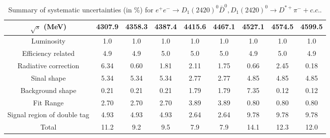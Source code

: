 \documentclass[aps,preprint,superscriptaddress,12pt,tightenlines]{revtex4}
\begin{document}
\begin{table}[htbp]
\caption{Summary of systematic uncertainties (in \%) for
$e^{+}e^{-}\to D_{1}(2420)^{0}\bar{D}^{0}, D_{1}(2420)^{0}\to D^{*+}\pi^{-} +c.c.$.}
\label{sys_err_D0star}
\begin{tabular}{c  c  c  c c c c c c}
\hline \hline
   $\sqrt{s}$ (MeV)    &4307.9   &4358.3  &4387.4   &4415.6  &4467.1   &4527.1  &4574.5   &4599.5\\
    \hline
   Luminosity                  & 1.0   & 1.0  & 1.0   & 1.0  & 1.0   & 1.0   & 1.0   & 1.0 \\
    Efficiency related          &4.9	&4.9   &5.0	   &5.0	  &5.0    &4.9	  &5.0	  &4.9 \\
    Radiative correction        &6.34   &0.60  &1.81   &2.11  &1.75   &0.66   &2.45   &0.18   \\
    Sinal shape                 &5.34   &5.34  &5.34   &2.77  &2.77   &4.85   &4.85   &4.85  \\
    Background shape            &0.21   &0.21  &0.21   &1.79  &1.79   &7.35   &0.12   &0.12  \\
    Fit Range                   &2.70   &2.70  &2.70   &3.89  &3.89   &0.80   &0.80   &0.80   \\
    Signal region of double tag &4.93   &4.93  &4.93   &2.64  &2.64   &9.78   &9.78   &9.78  \\
    \hline
    Total                       &11.2  &9.2  &9.5  &7.9  &7.9  &14.1  &12.3  &12.0    \\
    \hline
    \hline
\end{tabular}
\end{table}
\end{document}
